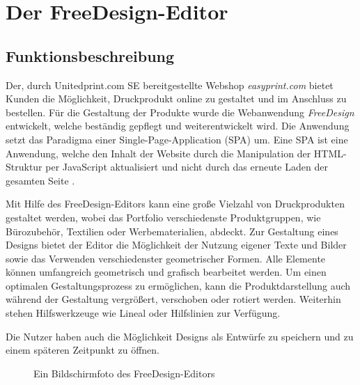 \section{Der FreeDesign-Editor}
\label{Der FreeDesign-Editor}
\subsection{Funktionsbeschreibung}
Der, durch Unitedprint.com SE bereitgestellte Webshop \emph{easyprint.com} bietet Kunden die Möglichkeit, Druckprodukt online zu gestaltet und im Anschluss zu bestellen. Für die Gestaltung der Produkte wurde die Webanwendung \emph{FreeDesign} entwickelt, welche beständig gepflegt und weiterentwickelt wird. 
Die Anwendung setzt das Paradigma einer Single-Page-Application (SPA) um. 
Eine SPA ist eine Anwendung, welche den Inhalt der Website durch die Manipulation der HTML-Struktur per JavaScript aktualisiert und nicht durch das erneute Laden der gesamten Seite \autocite[vgl.][497]{Flanagan2006}.  

Mit Hilfe des FreeDesign-Editors kann eine große Vielzahl von Druckprodukten gestaltet werden, wobei das Portfolio verschiedenste Produktgruppen, wie Bürozubehör, Textilien oder Werbematerialien, abdeckt. Zur Gestaltung eines Designs bietet der Editor die Möglichkeit der Nutzung eigener Texte und Bilder sowie das Verwenden verschiedenster geometrischer Formen. Alle Elemente können umfangreich geometrisch und grafisch bearbeitet werden. Um einen optimalen Gestaltungsprozess zu ermöglichen, kann die Produktdarstellung auch während der Gestaltung vergrößert, verschoben oder rotiert werden. Weiterhin stehen Hilfswerkzeuge wie Lineal oder Hilfslinien zur Verfügung. 

Die Nutzer haben auch die Möglichkeit Designs als Entwürfe zu speichern und zu einem späteren Zeitpunkt zu öffnen.

\begin{figure}[H]
    \centering
    \caption{Ein Bildschirmfoto des FreeDesign-Editors}
    \label{fig:Der FreeDesign-Editor}
\end{figure}

